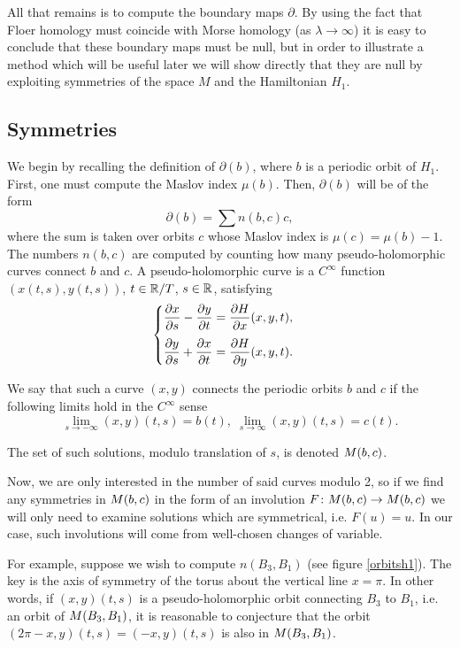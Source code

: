 All that remains is to compute the boundary maps $\partial$. By using the fact that Floer homology must coincide with Morse homology (as $\lambda \to \infty$) it is easy to conclude that these boundary maps must be null, but in order to illustrate a method which will be useful later we will show directly that they are null by exploiting symmetries of the space $M$ and the Hamiltonian $H_1$.

\subsection{Symmetries}

We begin by recalling the definition of $\partial(b)$, where $b$ is a periodic orbit of $H_1$. First, one must compute the Maslov index $\mu(b)$. Then, $\partial(b)$ will be of the form
\begin{equation}
\partial(b) = \sum n(b,c) c,
\end{equation}
where the sum is taken over orbits $c$ whose Maslov index is $\mu(c) = \mu(b)-1$. The numbers $n(b,c)$ are computed by counting how many pseudo-holomorphic curves connect $b$ and $c$. A pseudo-holomorphic curve is a $C^\infty$ function $(x(t,s), y(t,s))$, $t \in \mathbb{R} / T$, $s \in \mathbb{R}$, satisfying
\begin{equation}\label{pseudoholomorphic}
\begin{cases}
\displaystyle \diffp x s - \diffp y t = \diffp H x(x,y,t),\\[1em]
\displaystyle \diffp y s + \diffp x t = \diffp H y(x,y,t).
\end{cases}
\end{equation}

We say that such a curve $(x,y)$ connects the periodic orbits $b$ and $c$ if the following limits hold in the $C^\infty$ sense
\begin{equation}
\lim_{s \to -\infty} (x,y)(t,s) = b(t), \; \lim_{s \to \infty} (x,y)(t,s) = c(t).
\end{equation}

The set of such solutions, modulo translation of $s$, is denoted $M(b,c)$.

Now, we are only interested in the number of said curves modulo 2, so if we find any symmetries in $M(b,c)$ in the form of an involution $F \colon M(b,c) \to M(b,c)$ we will only need to examine solutions which are symmetrical, i.e. $F(u) = u$. In our case, such involutions will come from well-chosen changes of variable.

For example, suppose we wish to compute $n(B_3, B_1)$ (see figure \ref{orbitsh1}). The key is the axis of symmetry of the torus about the vertical line $x = \pi$. In other words, if $(x,y)(t,s)$ is a pseudo-holomorphic orbit connecting $B_3$ to $B_1$, i.e. an orbit of $M(B_3,B_1)$, it is reasonable to conjecture that the orbit $(2\pi-x, y)(t,s) = (-x,y)(t,s)$ is also in $M(B_3,B_1)$.

